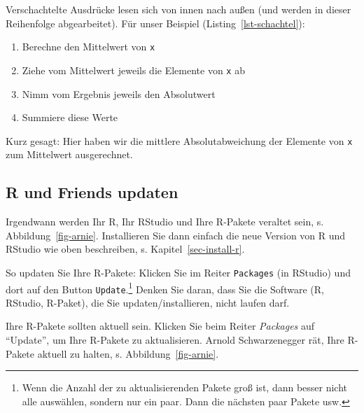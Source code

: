 \documentclass[
  a4paper,
  DIV=11]{scrreprt}
\providecommand{\tightlist}{%
  \setlength{\itemsep}{0pt}\setlength{\parskip}{0pt}}\usepackage{longtable,booktabs,array}
\theoremstyle{definition}
\theoremstyle{definition}
\theoremstyle{definition}
\theoremstyle{remark}
\begin{document}
Verschachtelte Ausdrücke lesen sich von innen nach außen (und werden in
dieser Reihenfolge abgearbeitet). Für unser Beispiel
(Listing~\ref{lst-schachtel}):

\begin{enumerate}
\def\labelenumi{\arabic{enumi}.}
\tightlist
\item
  Berechne den Mittelwert von \texttt{x}
\item
  Ziehe vom Mittelwert jeweils die Elemente von \texttt{x} ab
\item
  Nimm vom Ergebnis jeweils den Absolutwert
\item
  Summiere diese Werte
\end{enumerate}

Kurz gesagt: Hier haben wir die mittlere Absolutabweichung der Elemente
von \texttt{x} zum Mittelwert ausgerechnet.

\subsection{R und Friends updaten}\label{r-und-friends-updaten}

Irgendwann werden Ihr R, Ihr RStudio und Ihre R-Pakete veraltet sein, s.
Abbildung~\ref{fig-arnie}. Installieren Sie dann einfach die neue
Version von R und RStudio wie oben beschreiben, s.
Kapitel~\ref{sec-install-r}.

So updaten Sie Ihre R-Pakete: Klicken Sie im Reiter \texttt{Packages}
(in RStudio) und dort auf den Button \texttt{Update}.\footnote{Wenn die
  Anzahl der zu aktualisierenden Pakete groß ist, dann besser nicht alle
  auswählen, sondern nur ein paar. Dann die nächsten paar Pakete usw.}
Denken Sie daran, dass Sie die Software (R, RStudio, R-Paket), die Sie
updaten/installieren, nicht laufen darf.

\begin{tcolorbox}[enhanced jigsaw, leftrule=.75mm, opacitybacktitle=0.6, colback=white, colframe=quarto-callout-note-color-frame, coltitle=black, colbacktitle=quarto-callout-note-color!10!white, opacityback=0, left=2mm, breakable, titlerule=0mm, toptitle=1mm, bottomtitle=1mm, rightrule=.15mm, title=\textcolor{quarto-callout-note-color}{\faInfo}\hspace{0.5em}{Hinweis}, arc=.35mm, bottomrule=.15mm, toprule=.15mm]

Ihre R-Pakete sollten aktuell sein. Klicken Sie beim Reiter
\emph{Packages} auf ``Update'', um Ihre R-Pakete zu aktualisieren.
Arnold Schwarzenegger rät, Ihre R-Pakete aktuell zu halten, s.
Abbildung~\ref{fig-arnie}\footnotemark{}.

\end{tcolorbox}
\end{document}
